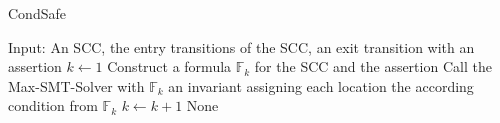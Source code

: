 \begin{algorithm}
\caption{CondSafe}\label{condsafe}
\begin{algorithmic}[1]
\State Input: An SCC, the entry transitions of the SCC, an exit transition with an assertion
\State $k \gets 1$
\Repeat
  \State Construct a formula $\mathbb{F}_k$ for the SCC and the assertion
  \State Call the Max-SMT-Solver with $\mathbb{F}_k$
    \Return an invariant assigning each location the according condition from $\mathbb{F}_k$
  \EndIf
  \State $k \gets k + 1$
\Return None
\end{algorithmic}
\end{algorithm}

